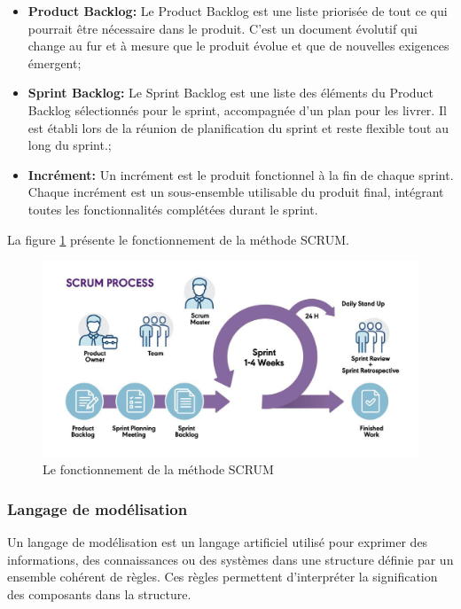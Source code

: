\documentclass[12pt]{report}
\begin{document}
				\begin{itemize}
					\item \textbf{Product Backlog:} Le Product Backlog est une liste priorisée de tout ce qui pourrait être nécessaire dans le produit. C'est un document évolutif qui change au fur et à mesure que le produit évolue et que de nouvelles exigences émergent;
					\item \textbf{Sprint Backlog:} Le Sprint Backlog est une liste des éléments du Product Backlog sélectionnés pour le sprint, accompagnée d'un plan pour les livrer. Il est établi lors de la réunion de planification du sprint et reste flexible tout au long du sprint.;
					\item \textbf{Incrément:} Un incrément est le produit fonctionnel à la fin de chaque sprint. Chaque incrément est un sous-ensemble utilisable du produit final, intégrant toutes les fonctionnalités complétées durant le sprint.
				\end{itemize}

				La figure \ref{fig:SCRUM} présente le fonctionnement de la méthode SCRUM.

				\begin{figure}[h]
					\centering
					\includegraphics[width=\textwidth]{scrum.jpg}
					\caption{Le fonctionnement de la méthode SCRUM\cite{pm-partners}}
					\label{fig:SCRUM}
				\end{figure}
				\FloatBarrier				


				\subsubsection{Langage de modélisation}

				\hspace{15pt} Un langage de modélisation est un langage artificiel utilisé pour exprimer des informations, des connaissances ou des systèmes dans une structure définie par un ensemble cohérent de règles. Ces règles permettent d'interpréter la signification des composants dans la structure. 
\end{document}
